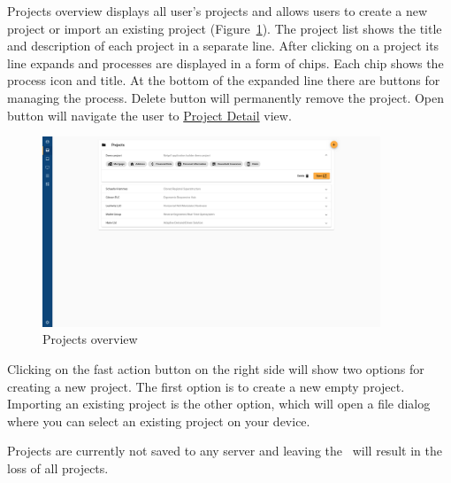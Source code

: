 Projects overview displays all user's projects and allows users to create a new project or import an existing project (Figure~\ref{fig:projects_overview}).
The project list shows the title and description of each project in a separate line.
After clicking on a project its line expands and processes are displayed in a form of chips.
Each chip shows the process icon and title.
At the bottom of the expanded line there are buttons for managing the process.
Delete button will permanently remove the project.
Open button will navigate the user to \hyperref[sec:project-detail]{Project Detail} view.

\begin{figure}[h!]
  \centering
  \includegraphics[width=0.9\textwidth]{images/projects_view.png}
  \caption{Projects overview}
  \label{fig:projects_overview}
\end{figure}

Clicking on the fast action button on the right side will show two options for creating a new project.
The first option is to create a new empty project.
Importing an existing project is the other option, which will open a file dialog where you can select an existing project on your device.

Projects are currently not saved to any server and leaving the \builder~will result in the loss of all projects.
